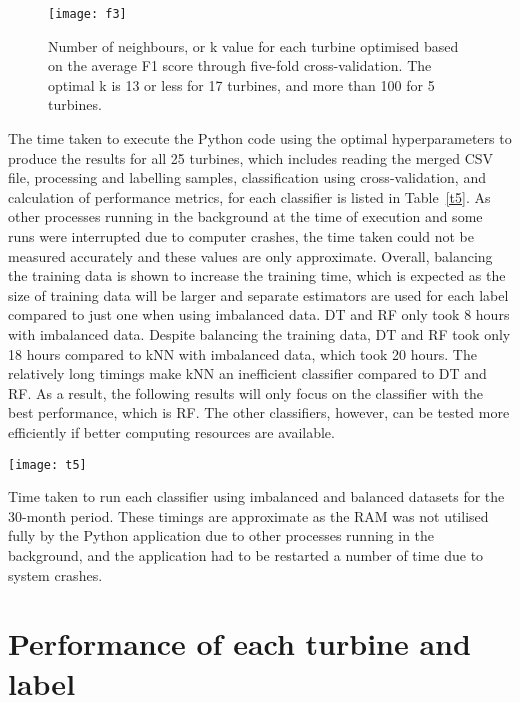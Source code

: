 \begin{figure}
    \centering
    \texttt{[image: f3]}
    \caption{\label{f3}Number of neighbours, or k value for each turbine optimised based on the average F1 score through five-fold cross-validation. The optimal k is 13 or less for 17 turbines, and more than 100 for 5 turbines.}
\end{figure}

The time taken to execute the Python code using the optimal hyperparameters to produce the results for all 25 turbines, which includes reading the merged CSV file, processing and labelling samples, classification using cross-validation, and calculation of performance metrics, for each classifier is listed in Table~\ref{t5}. As other processes running in the background at the time of execution and some runs were interrupted due to computer crashes, the time taken could not be measured accurately and these values are only approximate. Overall, balancing the training data is shown to increase the training time, which is expected as the size of training data will be larger and separate estimators are used for each label compared to just one when using imbalanced data. DT and RF only took 8 hours with imbalanced data. Despite balancing the training data, DT and RF took only 18 hours compared to kNN with imbalanced data, which took 20 hours. The relatively long timings make kNN an inefficient classifier compared to DT and RF. As a result, the following results will only focus on the classifier with the best performance, which is RF. The other classifiers, however, can be tested more efficiently if better computing resources are available.

\begin{table}
    \centering
    \texttt{[image: t5]}
    \caption{\label{t5}Time taken to run each classifier using imbalanced and balanced datasets for the 30-month period. These timings are approximate as the RAM was not utilised fully by the Python application due to other processes running in the background, and the application had to be restarted a number of time due to system crashes.}
\end{table}

\section{Performance of each turbine and label}

